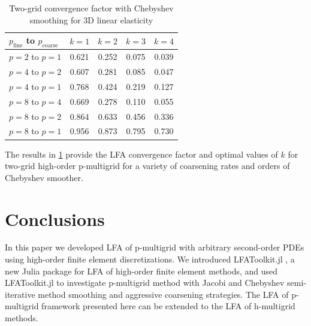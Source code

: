 \documentclass[review]{siamart190516}
\begin{document}
\begin{table}[ht!]
\begin{center}
\begin{tabular}{l c c c c}
  \toprule
  $p_{\text{fine}}$ to $p_{\text{coarse}}$  &  $k = 1$   &  $k = 2$   &  $k = 3$   &  $k = 4$   \\
  \toprule
  $p = 2$ to $p = 1$   &  0.621  &  0.252  &  0.075  &  0.039  \\
  \midrule
  $p = 4$ to $p = 2$   &  0.607  &  0.281  &  0.085  &  0.047  \\
  $p = 4$ to $p = 1$   &  0.768  &  0.424  &  0.219  &  0.127  \\
  \midrule
  $p = 8$ to $p = 4$   &  0.669  &  0.278  &  0.110  &  0.055  \\
  $p = 8$ to $p = 2$   &  0.864  &  0.633  &  0.456  &  0.336  \\
  $p = 8$ to $p = 1$   &  0.956  &  0.873  &  0.795  &  0.730  \\
  \bottomrule
\end{tabular}
\end{center}
\caption{Two-grid convergence factor with Chebyshev smoothing for 3D linear elasticity}
\label{table:two_grid_3d_linear_elasticity}
\end{table}

The results in \cref{table:two_grid_3d_linear_elasticity} provide the LFA convergence factor and optimal values of $k$ for two-grid high-order p-multigrid for a variety of coarsening rates and orders of Chebyshev smoother.

\section{Conclusions}\label{sec:conclusion}

In this paper we developed LFA of p-multigrid with arbitrary second-order PDEs using high-order finite element discretizations.
We introduced LFAToolkit.jl \cite{thompson2021toolkit}, a new Julia package for LFA of high-order finite element methods, and used LFAToolkit.jl to investigate p-multigrid method with Jacobi and Chebyshev semi-iterative method smoothing and aggressive coarsening strategies.
The LFA of p-multigrid framework presented here can be extended to the LFA of h-multigrid methods.
\end{document}
